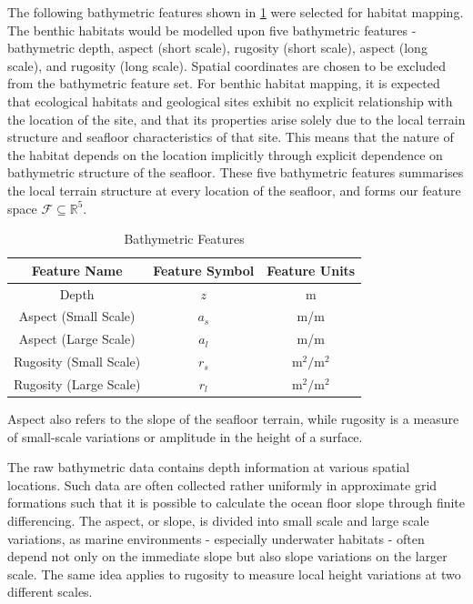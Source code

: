 		The following bathymetric features shown in \cref{Table:BathymetricFeatures} were selected for habitat mapping. The benthic habitats would be modelled upon five bathymetric features - bathymetric depth, aspect (short scale), rugosity (short scale), aspect (long scale), and rugosity (long scale). Spatial coordinates are chosen to be excluded from the bathymetric feature set. For benthic habitat mapping, it is expected that ecological habitats and geological sites exhibit no explicit relationship with the location of the site, and that its properties arise solely due to the local terrain structure and seafloor characteristics  of that site. This means that the nature of the habitat depends on the location implicitly through explicit dependence on bathymetric structure of the seafloor. These five bathymetric features summarises the local terrain structure at every location of the seafloor, and forms our feature space $\mathcal{F} \subseteq \mathbb{R}^{5}$.
		
		\begin{table}[h]
			\begin{center}
				\begin{tabular}{ |c|c|c| }
					\hline
					Feature Name & Feature Symbol & Feature Units \\
					\hline
					Depth & $z$ & m \\
					Aspect (Small Scale) & $a_{s}$ & m/m \\
					Aspect (Large Scale) & $a_{l}$& m/m \\
					Rugosity (Small Scale) & $r_{s}$ & $\mathrm{m^{2}/m^{2}}$ \\
					Rugosity (Large Scale) & $r_{l}$ & $\mathrm{m^{2}/m^{2}}$  \\
					\hline
				\end{tabular}
			\end{center}
	  	\caption{Bathymetric Features}
	  	\label{Table:BathymetricFeatures}			
	  	\end{table}	
		
		Aspect also refers to the slope of the seafloor terrain, while rugosity is a measure of small-scale variations or amplitude in the height of a surface.
		
		The raw bathymetric data contains depth information at various spatial locations. Such data are often collected rather uniformly in approximate grid formations such that it is possible to calculate the ocean floor slope through finite differencing. The aspect, or slope, is divided into small scale and large scale variations, as marine environments - especially underwater habitats - often depend not only on the immediate slope but also slope variations on the larger scale. The same idea applies to rugosity to measure local height variations at two different scales.
		
